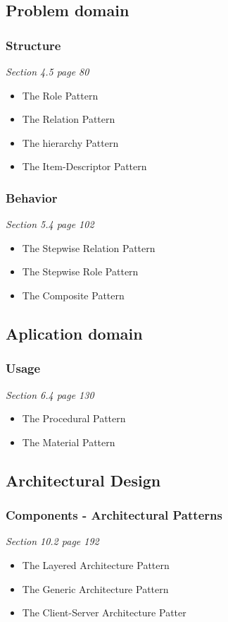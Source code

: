 \subsection{Problem domain}
\subsubsection{Structure}
\textit{Section 4.5 page 80}
\begin{itemize}
    \item The Role Pattern
    \item The Relation Pattern
    \item The hierarchy Pattern
    \item The Item-Descriptor Pattern
\end{itemize}

\subsubsection{Behavior}
\textit{Section 5.4 page 102}
\begin{itemize}
    \item The Stepwise Relation Pattern
    \item The Stepwise Role Pattern
    \item The Composite Pattern
\end{itemize}

\subsection{Aplication domain}
\subsubsection{Usage}
\textit{Section 6.4 page 130}
\begin{itemize}
    \item The Procedural Pattern
    \item The Material Pattern
\end{itemize}

\subsection{Architectural Design}
\subsubsection{Components - Architectural Patterns}
\textit{Section 10.2 page 192}
\begin{itemize}
    \item The Layered Architecture Pattern
    \item The Generic Architecture Pattern
    \item The Client-Server Architecture Patter
\end{itemize}

